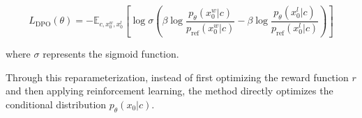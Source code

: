 \begin{equation}
    L_{\text{DPO}}(\theta) = -\mathit{\mathbb{E}}_{c,x^{w}_0,x^{l}_0} [\log \sigma (\beta \log \frac{p_\theta (x^{w}_0|c)}{p_{\text{ref}}(x^{w}_0|c)} - \beta \log \frac{p_\theta(x^{l}_0|c)}{p_{\text{ref}}(x^{l}_0|c)})]
\label{eq:dpo_loss}
\end{equation}

where \(\sigma\) represents the sigmoid function.

Through this reparameterization, instead of first optimizing the reward function \( r \) and then applying reinforcement learning, the method directly optimizes the conditional distribution \( p_{\theta}(x_0|c) \).
